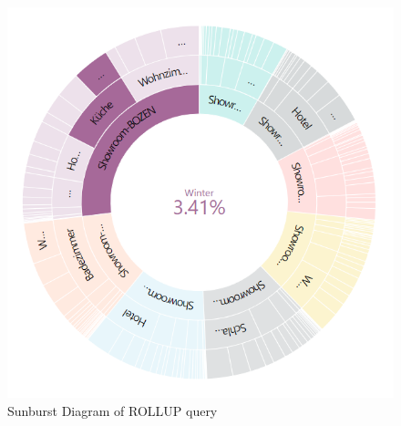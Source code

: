 \documentclass[letterpaper,12pt]{article}
\begin{document}
\begin{figure}[H] 
        \centering
        \includegraphics[width=\columnwidth]{../images/sunburst.PNG}
        \caption{
                \label{fig:sunburst}  
                Sunburst Diagram of ROLLUP query
        }
\end{figure}
\end{document}
